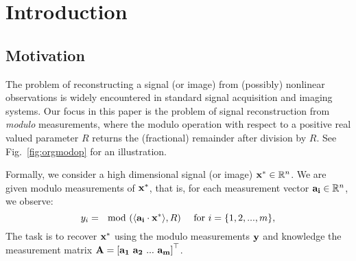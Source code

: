 \section{Introduction}
\label{sec:intro}
\subsection{Motivation}
The problem of reconstructing a signal (or image) from (possibly) nonlinear observations is widely encountered in standard signal acquisition and imaging systems. Our focus in this paper is the problem of signal reconstruction from \textit{modulo} measurements, where the modulo operation with respect to a positive real valued parameter $R$ returns the (fractional) remainder after division by $R$. See Fig.~\ref{fig:orgmodop} for an illustration.


Formally, we consider a high dimensional signal (or image) $\mathbf{x}^* \in {\mathbb{R}}^n$. We are given modulo measurements of $\mathbf{x^*}$, that is, for each measurement vector $\mathbf{a_i} \in {\mathbb{R}}^n$, we observe:
\begin{equation}
y_i=\mod(\langle \mathbf{a_i} \cdot \mathbf{x^*} \rangle,R)~~~~\textnormal{for}~i = \{1,2,...,m\}, \nonumber
\label{eq:modmeas0}
\end{equation} 
The task is to recover $\mathbf{x^*}$ using the modulo measurements $\mathbf{y}$ and knowledge the measurement matrix $\mathbf{A} = \left[\mathbf{a_1~a_2~...~a_m}\right]^\top$. %



